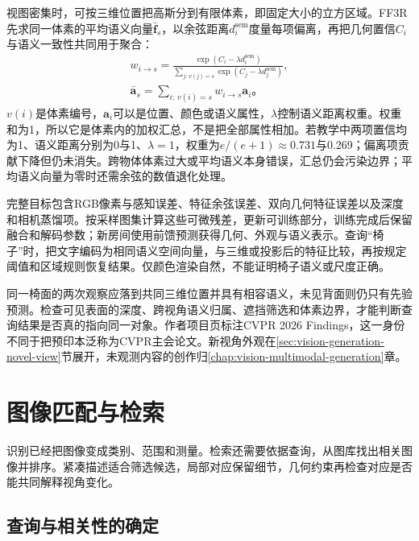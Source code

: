 视图密集时，可按三维位置把高斯分到有限体素，即固定大小的立方区域。FF3R先求同一体素的平均语义向量$\bar{\bm{f}}_s$，以余弦距离$d_i^{\mathrm{sem}}$度量每项偏离，再把几何置信$C_i$与语义一致性共同用于聚合：
\begin{equation}
 \begin{aligned}
 w_{i\to s}=
 \frac{\exp(C_i-\lambda d_i^{\mathrm{sem}})}
 {\sum_{j:\,v(j)=s}\exp(C_j-\lambda d_j^{\mathrm{sem}})},\\
 \bar{\bm{a}}_s=\sum_{i:\,v(i)=s}w_{i\to s}\bm{a}_i\text{。}
 \end{aligned}
 \label{eq:vision-ff3r-voxel}
\end{equation}
$v(i)$是体素编号，$\bm{a}_i$可以是位置、颜色或语义属性，$\lambda$控制语义距离权重。权重和为1，所以它是体素内的加权汇总，不是把全部属性相加。若教学中两项置信均为1、语义距离分别为0与1、$\lambda=1$，权重为$e/(e+1)\approx0.731$与0.269；偏离项贡献下降但仍未消失。跨物体体素过大或平均语义本身错误，汇总仍会污染边界；平均语义向量为零时还需余弦的数值退化处理。

完整目标包含RGB像素与感知误差、特征余弦误差、双向几何特征误差以及深度和相机蒸馏项。按采样图集计算这些可微残差，更新可训练部分，训练完成后保留融合和解码参数；新房间使用前馈预测获得几何、外观与语义表示。查询“椅子”时，把文字编码为相同语义空间向量，与三维或投影后的特征比较，再按规定阈值和区域规则恢复结果。仅颜色渲染自然，不能证明椅子语义或尺度正确。

同一椅面的两次观察应落到共同三维位置并具有相容语义，未见背面则仍只有先验预测。检查可见表面的深度、跨视角语义归属、遮挡筛选和体素边界，才能判断查询结果是否真的指向同一对象。作者项目页标注CVPR 2026 Findings，这一身份不同于把预印本泛称为CVPR主会论文。新视角外观在\ref{sec:vision-generation-novel-view}节展开，未观测内容的创作归\ref{chap:vision-multimodal-generation}章。

\section{图像匹配与检索}
\label{sec:vision-recognition-retrieval}

识别已经把图像变成类别、范围和测量。检索还需要依据查询，从图库找出相关图像并排序。紧凑描述适合筛选候选，局部对应保留细节，几何约束再检查对应是否能共同解释视角变化。

\subsection{查询与相关性的确定}
\label{sec:vision-recognition-relevance}

